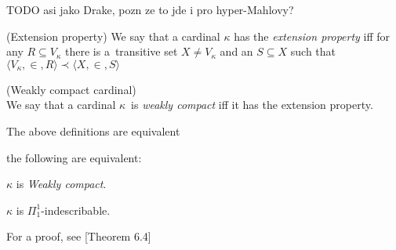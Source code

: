 TODO asi jako Drake, pozn ze to jde i pro hyper-Mahlovy?

\begin{definition}{(Extension property)}
We say that a cardinal $\kappa$ has the \emph{extension property} iff for any $R \subseteq V_\kappa$ there is a~transitive set 
$X \neq V_\kappa$ and an $S \subseteq X$ such that 
$\langle V_\kappa, \in, R \rangle \prec \langle X, \in, S \rangle$
\end{definition}


\begin{definition}{(Weakly compact cardinal)}\label{def:weakly_compact_extension}\\
We say that a cardinal $\kappa$ is \emph{weakly compact} iff it has the extension property.
\end{definition}


The above definitions are equivalent

\begin{theorem}
the following are equivalent:\\
\bce[(i)]
\item $\kappa$ is \emph{Weakly compact}.
\item $\kappa$ is $\Pi^1_1$-indescribable.
\ece
\end{theorem}

For a proof, see \cite{KanamoriBook}[Theorem 6.4]



{\color{red}
\begin{comment}
\begin{theorem}\label{th:refl_weakly_compact}
Let $\kappa$ be a~weakly compact cardinal. Then for every stationary set $S \subset \kappa$ there is an uncountable regular cardinal $\lambda < \kappa$ such that the set $S \cap \lambda$ is stationary in $\lambda$.
\end{theorem}
\begin{proof}
TODO %
\end{proof}

\

\end{comment}
}

